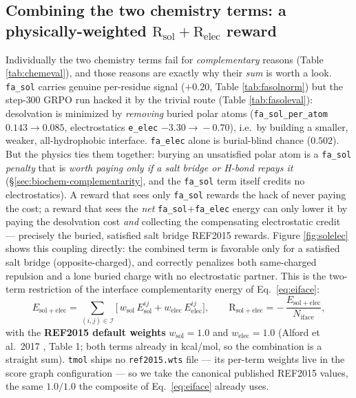 \documentclass[11pt]{article}
\newcommand{\R}{\mathrm{R}}
\newcommand{\ttk}[1]{\texttt{\small #1}}
\begin{document}
\subsection{Combining the two chemistry terms: a physically-weighted \texorpdfstring{$\R_{\mathrm{sol}}+\R_{\mathrm{elec}}$}{fa\_sol + fa\_elec} reward}
\label{sec:solelec-combined}
Individually the two chemistry terms fail for \emph{complementary} reasons
(Table \ref{tab:chemeval}), and those reasons are
exactly why their \emph{sum} is worth a look. \ttk{fa\_sol} carries genuine per-residue signal
($+0.20$, Table \ref{tab:fasolnorm}) but the step-$300$ GRPO run hacked it by the trivial route
(Table \ref{tab:fasoleval}): desolvation is minimized by \emph{removing} buried polar atoms
(\ttk{fa\_sol\_per\_atom} $0.143\!\to\!0.085$, electrostatics \ttk{e\_elec} $-3.30\!\to\!-0.70$), i.e.\
by building a smaller, weaker, all-hydrophobic interface. \ttk{fa\_elec} alone is burial-blind chance
($0.502$). But the physics ties them together: burying an unsatisfied polar atom is a \ttk{fa\_sol}
\emph{penalty} that is \emph{worth paying only if a salt bridge or H-bond repays it}
(\S\ref{sec:biochem-complementarity}, and the \ttk{fa\_sol} term itself credits no electrostatics).
A reward that sees only \ttk{fa\_sol} rewards the hack of never paying the cost; a reward that sees the
\emph{net} \ttk{fa\_sol}$+$\ttk{fa\_elec} energy can only lower it by paying the desolvation cost
\emph{and} collecting the compensating electrostatic credit --- precisely the buried, satisfied salt
bridge REF2015 rewards. Figure \ref{fig:solelec} shows this coupling directly: the combined term is
favorable only for a satisfied salt bridge (opposite-charged), and correctly penalizes both
same-charged repulsion and a lone buried charge with no electrostatic partner. This is the two-term
restriction of the interface complementarity energy of
Eq.\ \ref{eq:eiface}:
\begin{equation}
E_{\mathrm{sol+elec}}=\!\!\sum_{(i,j)\in\mathcal I}\!\big[\,w_{\mathrm{sol}}\,E^{ij}_{\mathrm{sol}}
  +w_{\mathrm{elec}}\,E^{ij}_{\mathrm{elec}}\big],
\qquad
\R_{\mathrm{sol+elec}}=-\,\frac{E_{\mathrm{sol+elec}}}{N_{\mathrm{iface}}},
\label{eq:solelec}
\end{equation}
with the \textbf{REF2015 default weights} $w_{\mathrm{sol}}{=}1.0$ and $w_{\mathrm{elec}}{=}1.0$
(Alford et al.\ 2017 \cite{alford2017}, Table 1; both terms already in kcal/mol, so the combination is
a straight sum). \ttk{tmol} ships no \ttk{ref2015.wts} file --- its per-term weights live in the score
graph configuration --- so we take the canonical published REF2015 values, the same $1.0/1.0$ the
composite of Eq.\ \ref{eq:eiface} already uses.
\end{document}
